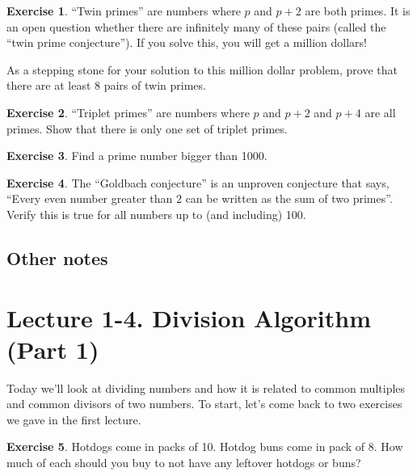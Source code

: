 \documentclass[11pt]{article}
\theoremstyle{definition}
\newtheorem{exercise}{Exercise}
\numberwithin{thm}{section}
\begin{document}
\begin{exercise} ``Twin primes'' are numbers where $p$ and $p+2$ are both primes. It is an open question whether there are infinitely many of these pairs (called the ``twin prime conjecture''). If you solve this, you will get a million dollars!

As a stepping stone for your solution to this million dollar problem, prove that there are at least 8 pairs of twin primes.
\end{exercise}

\begin{exercise} ``Triplet primes'' are numbers where $p$ and $p+2$ and $p+4$ are all primes. Show that there is only one set of triplet primes.
\end{exercise}

\begin{exercise} Find a prime number bigger than 1000.
\end{exercise}

\begin{exercise} The ``Goldbach conjecture'' is an unproven conjecture that says, ``Every even number greater than $2$ can be written as the sum of two primes''. Verify this is true for all numbers up to (and including) 100.
\end{exercise}

\subsection{Other notes}




\newpage
\section{Lecture 1-4. Division Algorithm (Part 1)}

Today we'll look at dividing numbers and how it is related to common multiples and common divisors of two numbers. To start, let's come back to two exercises we gave in the first lecture.

\begin{exercise} Hotdogs come in packs of 10. Hotdog buns come in pack of 8. How much of each should you buy to not have any leftover hotdogs or buns?
\end{exercise}
\end{document}
